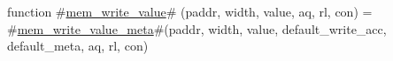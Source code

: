 function #\hyperref[sailRISCVzmemzywritezyvalue]{mem\_write\_value}# (paddr, width, value, aq, rl, con) = {
  #\hyperref[sailRISCVzmemzywritezyvaluezymeta]{mem\_write\_value\_meta}#(paddr, width, value, default_write_acc, default_meta, aq, rl, con)
}
